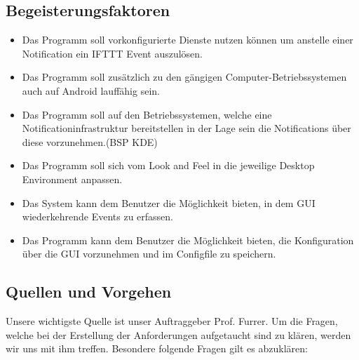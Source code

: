 \documentclass[11pt,titelpage]{scrartcl}
\begin{document}
\subsection{Begeisterungsfaktoren}


\begin{itemize}
\item
Das Programm soll vorkonfigurierte Dienste nutzen können um anstelle einer Notification  ein IFTTT Event auszulösen.

\item
Das Programm soll zusätzlich zu den gängigen Computer-Betriebssystemen auch auf Android lauffähig sein.


\item
Das Programm soll auf den Betriebssystemen, welche eine Notificationinfrastruktur bereitstellen  in der Lage sein die Notifications über diese vorzunehmen.(BSP KDE)

\item
Das Programm soll sich vom Look and Feel in die jeweilige Desktop Environment anpassen.
\item
Das System kann dem Benutzer die Möglichkeit bieten, in dem GUI wiederkehrende Events zu erfassen.
\item
Das Programm kann dem Benutzer die Möglichkeit bieten, die Konfiguration über die GUI vorzunehmen und im Configfile zu speichern.

\end{itemize}






\subsection{Quellen und Vorgehen}
Unsere wichtigste Quelle ist unser Auftraggeber Prof. Furrer. Um die Fragen, welche bei der Erstellung der
Anforderungen aufgetaucht sind zu klären, werden wir uns mit ihm treffen. Besondere folgende Fragen gilt es abzuklären:
\end{document}
